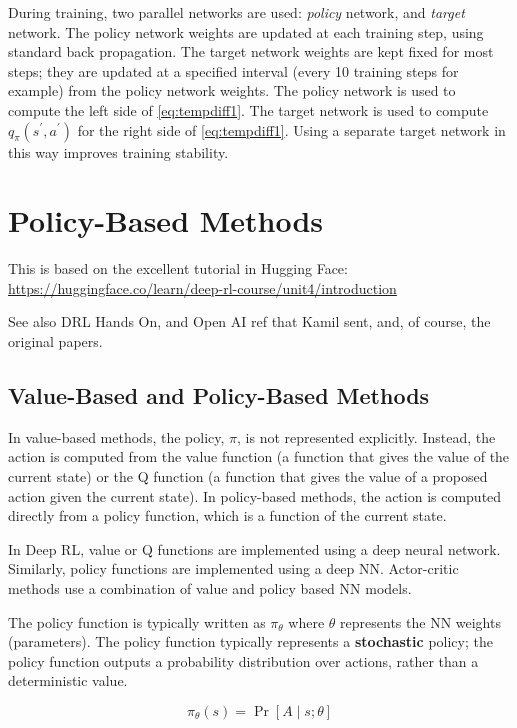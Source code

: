 \documentclass[acmlarge,screen]{acmart}
\begin{document}
During training, two parallel networks are used:  \textit{policy} network, and \textit{target} network.  
The policy network weights are updated at each training step, using standard back propagation.
The target network weights are kept fixed for most steps;  they are updated at a specified interval
(every 10 training steps for example) from the policy network weights.
The policy network is used to compute the left side of \ref{eq:tempdiff1}.  
The target network is used to compute $q_\pi (s^\prime, a^\prime)$ for the right side of \ref{eq:tempdiff1}.  
Using a separate target network in this way improves training stability.


\section{Policy-Based Methods}

This is based on the excellent tutorial in Hugging Face:
\url{https://huggingface.co/learn/deep-rl-course/unit4/introduction}

See also DRL Hands On, and Open AI ref that Kamil sent, and, of course, the original papers.

\subsection{Value-Based and Policy-Based Methods}

In value-based methods, the policy, $\pi$, is not represented explicitly.
Instead, the action is computed from the value function (a function that gives the value of the current state)
or the Q function (a function that gives the value of a proposed action given the current state).
In policy-based methods, the action is computed directly from a policy function, which is a function of the current state.

In Deep RL, value or Q functions are implemented using a deep neural network.
Similarly, policy functions are implemented using a deep NN.
Actor-critic methods use a combination of value and policy based NN models.

The policy function is typically written as $\pi_\theta$ where $\theta$ represents the NN weights (parameters).
The policy function typically represents a \textbf{stochastic} policy;  the policy function outputs a
probability distribution over actions, rather than a deterministic value.

\begin{equation}
  \pi_\theta (s) = \Pr \left[ A \mid s; \theta \right]
\label{eq:stochasticpolicy1}
\end{equation}
\end{document}
